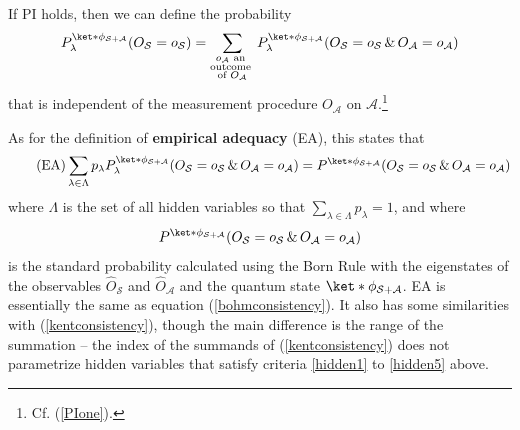 \documentclass[12pt]{report}
\begin{document}
If PI holds, then we can define the probability
\begin{equation}\label{generalPI}
	P^{\ket*{\phi}_{\mathcal{S}+\mathcal{A}}}_{\lambda}(O_\mathcal{S}=o_\mathcal{S})=\sum_{\substack{o_\mathcal{A}\text{ an }\\ \text{outcome }\\ 
	\text{of }O_{\mathcal{A}}}}P_\lambda^{\ket*{\phi}_{\mathcal{S}+\mathcal{A}}}(O_\mathcal{S}=o_\mathcal{S}\, \& \,O_\mathcal{A}=o_\mathcal{A})
\end{equation} %
%
that is independent of the measurement procedure $O_\mathcal{A}$ on $\mathcal{A}$.\footnote{Cf. (\ref{PIone}).}


As for the definition of \textbf{empirical adequacy} (EA),  this states that
\begin{equation}\tag{EA}\label{adeq}
	\sum_{\lambda\in\Lambda}p_\lambda P_\lambda^{\ket*{\phi}_{\mathcal{S}+\mathcal{A}}}(O_\mathcal{S}=o_\mathcal{S}\, \& \,O_\mathcal{A}=o_\mathcal{A})=P^{\ket*{\phi}_{\mathcal{S}+\mathcal{A}}}(O_\mathcal{S}=o_\mathcal{S}\, \& \,O_\mathcal{A}=o_\mathcal{A})
\end{equation}
where $\Lambda$ is the set of all hidden variables so that $\sum_{\lambda\in\Lambda} p_\lambda = 1$, %
%
 and where 
$$P^{\ket*{\phi}_{\mathcal{S}+\mathcal{A}}}(O_\mathcal{S}=o_\mathcal{S}\, \& \,O_\mathcal{A}=o_\mathcal{A})$$ %
%
 is the standard probability calculated using the Born Rule with the eigenstates of the observables $\hat{O}_\mathcal{S}$ and $\hat{O}_\mathcal{A}$ and the quantum state $\ket*{\phi}_{\mathcal{S}+\mathcal{A}}$. EA is essentially the same as equation (\ref{bohmconsistency}). It also has some similarities with (\ref{kentconsistency}), though the main difference is the range of the summation -- the index of the summands of (\ref{kentconsistency}) does not parametrize hidden variables that satisfy criteria \ref{hidden1} to \ref{hidden5} above.
\end{document}
